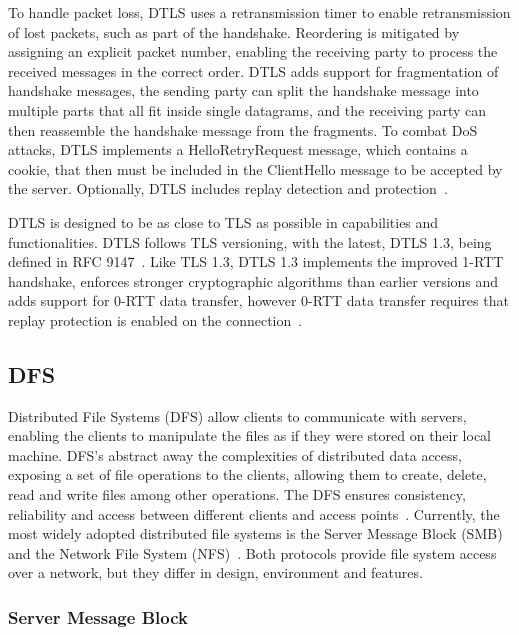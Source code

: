 \documentclass[english, 12pt, a4paper, elec, utf8, a-2b, online]{aaltothesis}
\begin{document}
To handle packet loss, DTLS uses a retransmission timer to enable retransmission of
lost packets, such as part of the handshake. Reordering is mitigated by assigning
an explicit packet number, enabling the receiving party to process the received
messages in the correct order. DTLS adds support for fragmentation of handshake messages,
the sending party can split the handshake message into multiple parts that all fit
inside single datagrams, and the receiving party can then reassemble the handshake message
from the fragments. To combat DoS attacks,  DTLS implements a HelloRetryRequest message,
which contains a cookie, that then must be included in the ClientHello message
to be accepted by the server. Optionally, DTLS includes replay detection and protection~\cite{rfc9147}.

DTLS is designed to be as close to TLS as possible in capabilities and functionalities.
DTLS follows TLS versioning, with the latest, DTLS 1.3, being defined in RFC 9147~\cite{rfc9147}.
Like TLS 1.3, DTLS 1.3 implements the improved 1-RTT handshake, enforces stronger
cryptographic algorithms than earlier versions and adds support for 0-RTT data transfer,
however 0-RTT data transfer requires that replay protection is enabled on the connection~\cite{rfc9147}.

\subsection{DFS}

Distributed File Systems (DFS) allow clients to communicate with servers, enabling
the clients to manipulate the files as if they were stored on their local machine.
DFS's abstract away the complexities of distributed data access, exposing a set
of file operations to the clients, allowing them to create, delete, read and write files among other operations.
The DFS ensures consistency, reliability and access between different
clients and access points~\cite{os_concepts}. Currently, the most widely adopted
distributed file systems is the Server Message Block (SMB)~\cite{smb2} and the
Network File System (NFS)~\cite{rfc7530}. Both protocols provide file system access
over a network, but they differ in design, environment and features.

\subsubsection{Server Message Block}
\end{document}
